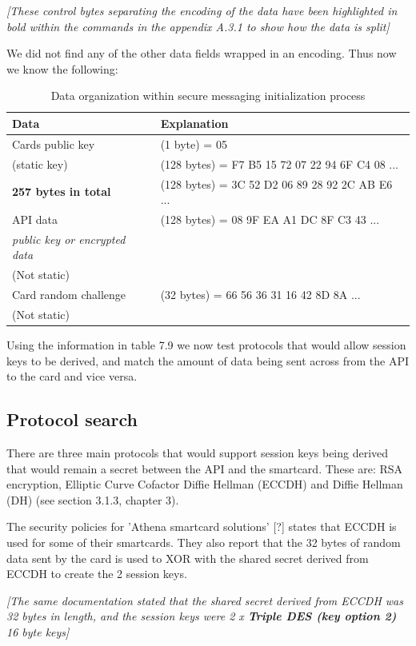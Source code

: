 \documentclass[bsc,frontabs,twoside,singlespacing,parskip,deptreport]{infthesis}     %
\begin{document}
\textit{[These control bytes separating the encoding of the data have been highlighted in bold within the commands in the appendix A.3.1 to show how the data is split]}

We did not find any of the other data fields wrapped in an encoding. Thus now we know the following:

\begin{table}[H]
\begin{tabular}{|l|l|}
\hline
Data & Explanation\\
\hline
Cards public key & (1 byte) = 05\\
(static key)    & (128 bytes) = F7 B5  15 72 07 22 94 6F C4 08 ...\\
\textbf{257 bytes in total} & (128 bytes) = 3C 52 D2 06 89 28 92 2C AB E6 ...\\
\hline
API data & (128 bytes) = 08 9F EA  A1 DC 8F C3 43 ...\\
\textit{public key or encrypted data} & \\
(Not static) & \\
\hline
Card random challenge & (32 bytes) = 66 56 36 31 16 42 8D 8A ...\\
(Not static) & \\
\hline
\end{tabular}
\caption{Data organization within secure messaging initialization process}
\end{table}

Using the information in table 7.9 we now test protocols that would allow session keys to be derived, and match the amount of data being sent across from the API to the card and vice versa.

\subsection{Protocol search}
There are three main protocols that would support session keys being derived that would remain a secret between the API and the smartcard. These are: RSA encryption, Elliptic Curve Cofactor Diffie Hellman (ECCDH) and Diffie Hellman (DH) (see section 3.1.3, chapter 3). 

The security policies for 'Athena smartcard solutions' [?] states that ECCDH is used for some of their smartcards. They also report that the 32 bytes of random data sent by the card is used to XOR with the shared secret derived from ECCDH to create the 2 session keys. 

\textit{[The same documentation stated that the shared secret derived from ECCDH was 32 bytes in length, and the session keys were 2 x  \textbf{Triple DES (key option 2)} 16 byte keys]}
\end{document}
